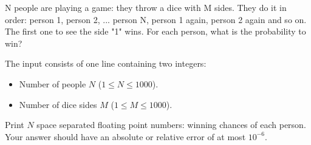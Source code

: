 \problemname{\problemyamlname}


\newcommand{\minn}{1}
\newcommand{\maxn}{1000}
\newcommand{\minm}{1}
\newcommand{\maxm}{1000}

N people are playing a game: they throw a dice with M sides. They do it in order: person 1, person 2, ... person N, person 1 again, person 2 again and so on. The first one to see the side "1" wins.
For each person, what is the probability to win?

\begin{Input}
    The input consists of one line containing two integers:
    \begin{itemize}
        \item Number of people $N$ ($\minn \leq N\leq \maxn$).
        \item Number of dice sides $M$ ($\minm \leq M\leq \maxm$).
    \end{itemize}
\end{Input}

\begin{Output}
    Print $N$ space separated floating point numbers: winning chances of each person.
    Your answer should have an absolute or relative error of at most $10^{-6}$.
\end{Output}
